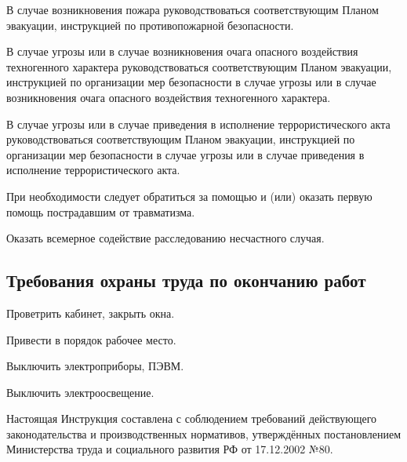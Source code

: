     В случае возникновения пожара руководствоваться соответствующим Планом эвакуации, инструкцией по противопожарной безопасности.

    В случае угрозы или в случае возникновения очага опасного воздействия техногенного характера руководствоваться соответствующим Планом эвакуации, инструкцией по организации мер безопасности в случае угрозы или в случае возникновения очага опасного воздействия техногенного характера.

    В случае угрозы или в случае приведения в исполнение террористического акта руководствоваться соответствующим Планом эвакуации, инструкцией по организации мер безопасности в случае угрозы или в случае приведения в исполнение террористического акта.

    При необходимости следует обратиться за помощью и (или) оказать первую помощь пострадавшим от травматизма.

    Оказать всемерное содействие расследованию несчастного случая.

\vspace{1.2cm}

\tocless\subsection{Требования охраны труда по окончанию работ}

Проветрить кабинет, закрыть окна.

Привести в порядок рабочее место.

Выключить электроприборы, ПЭВМ.

Выключить электроосвещение.

Настоящая Инструкция составлена с соблюдением требований действующего законодательства и производственных нормативов, утверждённых постановлением Министерства труда и социального развития РФ от 17.12.2002 №80.